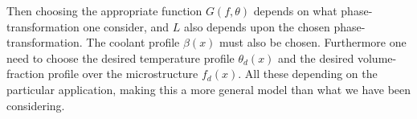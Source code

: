 Then choosing the appropriate function $G(f,\theta)$ depends on what phase-transformation one consider, and $L$ also depends upon the chosen phase-transformation. The coolant profile $\beta(x)$ must also be chosen. Furthermore one need to choose the desired temperature profile $\theta_d(x)$ and the desired volume-fraction profile over the microstructure $f_d(x)$. All these depending on the particular application, making this a more general model than what we have been considering. 
